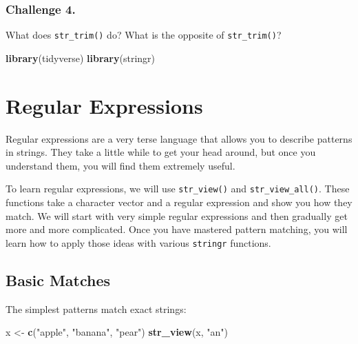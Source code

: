 \documentclass[
]{book}
\newenvironment{Shaded}{\begin{snugshade}}{\end{snugshade}}
\newcommand{\KeywordTok}[1]{\textcolor[rgb]{0.13,0.29,0.53}{\textbf{#1}}}
\newcommand{\NormalTok}[1]{#1}
\newcommand{\StringTok}[1]{\textcolor[rgb]{0.31,0.60,0.02}{#1}}
\begin{document}
\hypertarget{challenge-4.-3}{%
\subsubsection*{Challenge 4.}\label{challenge-4.-3}}

What does \texttt{str\_trim()} do? What is the opposite of \texttt{str\_trim()}?

\begin{Shaded}
\begin{Highlighting}[]
\KeywordTok{library}\NormalTok{(tidyverse)}
\KeywordTok{library}\NormalTok{(stringr)}
\end{Highlighting}
\end{Shaded}

\hypertarget{regular-expressions}{%
\section{Regular Expressions}\label{regular-expressions}}

Regular expressions are a very terse language that allows you to describe patterns in strings. They take a little while to get your head around, but once you understand them, you will find them extremely useful.

To learn regular expressions, we will use \texttt{str\_view()} and \texttt{str\_view\_all()}. These functions take a character vector and a regular expression and show you how they match. We will start with very simple regular expressions and then gradually get more and more complicated. Once you have mastered pattern matching, you will learn how to apply those ideas with various \texttt{stringr} functions.

\hypertarget{basic-matches}{%
\subsection{Basic Matches}\label{basic-matches}}

The simplest patterns match exact strings:

\begin{Shaded}
\begin{Highlighting}[]
\NormalTok{x <-}\StringTok{ }\KeywordTok{c}\NormalTok{(}\StringTok{"apple"}\NormalTok{, }\StringTok{"banana"}\NormalTok{, }\StringTok{"pear"}\NormalTok{)}
\KeywordTok{str_view}\NormalTok{(x, }\StringTok{"an"}\NormalTok{)}
\end{Highlighting}
\end{Shaded}
\end{document}
